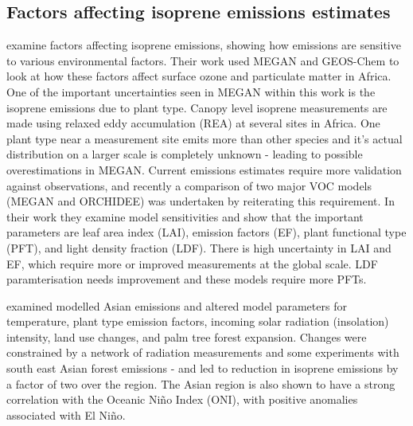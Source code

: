   \subsection{Factors affecting isoprene emissions estimates}
    
    \citet{Marais2014} examine factors affecting isoprene emissions, showing how emissions are sensitive to various environmental factors.
    Their work used MEGAN \citep{Guenther1995} and GEOS-Chem to look at how these factors affect surface ozone and particulate matter in Africa.
    One of the important uncertainties seen in MEGAN within this work is the isoprene emissions due to plant type. 
    Canopy level isoprene measurements are made using relaxed eddy accumulation (REA) at several sites in Africa.
    One plant type near a measurement site emits more than other species and it's actual distribution on a larger scale is completely unknown - leading to possible overestimations in MEGAN.
    Current emissions estimates require more validation against observations, and recently a comparison of two major VOC models (MEGAN and ORCHIDEE) was undertaken by \cite{Messina2016} reiterating this requirement.
    In their work they examine model sensitivities and show that the important parameters are leaf area index (LAI), emission factors (EF), plant functional type (PFT), and light density fraction (LDF).
    There is high uncertainty in LAI and EF, which require more or improved measurements at the global scale.
    LDF paramterisation needs improvement and these models require more PFTs.  
    
    \citet{Stavrakou2014} examined modelled Asian emissions and altered model parameters for temperature, plant type emission factors, incoming solar radiation (insolation) intensity, land use changes, and palm tree forest expansion.
    Changes were constrained by a network of radiation measurements and some experiments with south east Asian forest emissions - and led to reduction in isoprene emissions by a factor of two over the region.
    The Asian region is also shown to have a strong correlation with the Oceanic Niño Index (ONI), with positive anomalies associated with El Niño.
  
